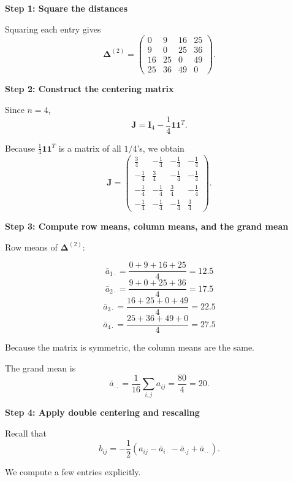 \medskip
\noindent
\textbf{Step 1: Square the distances}

\medskip

Squaring each entry gives
\[
\mathbf{\Delta}^{(2)}
=
\begin{pmatrix}
0 & 9 & 16 & 25 \\
9 & 0 & 25 & 36 \\
16 & 25 & 0 & 49 \\
25 & 36 & 49 & 0
\end{pmatrix}.
\]

\medskip
\noindent
\textbf{Step 2: Construct the centering matrix}

\medskip

Since $n = 4$,
\[
\mathbf{J}
=
\mathbf{I}_4 - \frac{1}{4}\mathbf{1}\mathbf{1}^T.
\]

Because $\frac{1}{4}\mathbf{1}\mathbf{1}^T$ is a matrix of all $1/4$'s, we obtain
{
\renewcommand{\arraystretch}{1.5}
\[
\mathbf{J}
=
\begin{pmatrix}
\frac{3}{4} & -\frac{1}{4} & -\frac{1}{4} & -\frac{1}{4} \\
-\frac{1}{4} & \frac{3}{4} & -\frac{1}{4} & -\frac{1}{4} \\
-\frac{1}{4} & -\frac{1}{4} & \frac{3}{4} & -\frac{1}{4} \\
-\frac{1}{4} & -\frac{1}{4} & -\frac{1}{4} & \frac{3}{4}
\end{pmatrix}.
\]}

\medskip
\noindent
\textbf{Step 3: Compute row means, column means, and the grand mean}

\medskip

Row means of $\mathbf{\Delta}^{(2)}$:

\[
\bar{a}_{1\cdot} = \frac{0+9+16+25}{4} = 12.5
\]
\[
\bar{a}_{2\cdot} = \frac{9+0+25+36}{4} = 17.5
\]
\[
\bar{a}_{3\cdot} = \frac{16+25+0+49}{4} = 22.5
\]
\[
\bar{a}_{4\cdot} = \frac{25+36+49+0}{4} = 27.5
\]

Because the matrix is symmetric, the column means are the same.

The grand mean is
\[
\bar{a}_{\cdot\cdot}
=
\frac{1}{16}
\sum_{i,j} a_{ij}
=
\frac{80}{4}
=
20.
\]

\medskip
\noindent
\textbf{Step 4: Apply double centering and rescaling}

\medskip

Recall that
\[
b_{ij}
=
-\frac{1}{2}
\left(
a_{ij}
-
\bar{a}_{i\cdot}
-
\bar{a}_{\cdot j}
+
\bar{a}_{\cdot\cdot}
\right).
\]

We compute a few entries explicitly.

